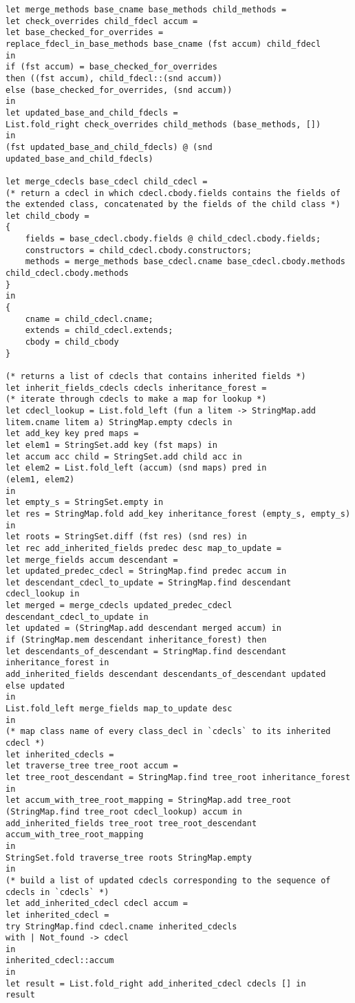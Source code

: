 \begin{verbatim}
let merge_methods base_cname base_methods child_methods =
let check_overrides child_fdecl accum = 
let base_checked_for_overrides = 
replace_fdecl_in_base_methods base_cname (fst accum) child_fdecl 
in
if (fst accum) = base_checked_for_overrides
then ((fst accum), child_fdecl::(snd accum)) 
else (base_checked_for_overrides, (snd accum))
in
let updated_base_and_child_fdecls = 
List.fold_right check_overrides child_methods (base_methods, [])
in
(fst updated_base_and_child_fdecls) @ (snd updated_base_and_child_fdecls)

let merge_cdecls base_cdecl child_cdecl = 
(* return a cdecl in which cdecl.cbody.fields contains the fields of 
the extended class, concatenated by the fields of the child class *)
let child_cbody = 
{
	fields = base_cdecl.cbody.fields @ child_cdecl.cbody.fields;
	constructors = child_cdecl.cbody.constructors;
	methods = merge_methods base_cdecl.cname base_cdecl.cbody.methods child_cdecl.cbody.methods
}
in
{
	cname = child_cdecl.cname;
	extends = child_cdecl.extends;
	cbody = child_cbody
}

(* returns a list of cdecls that contains inherited fields *)
let inherit_fields_cdecls cdecls inheritance_forest = 
(* iterate through cdecls to make a map for lookup *)
let cdecl_lookup = List.fold_left (fun a litem -> StringMap.add litem.cname litem a) StringMap.empty cdecls in
let add_key key pred maps = 
let elem1 = StringSet.add key (fst maps) in
let accum acc child = StringSet.add child acc in
let elem2 = List.fold_left (accum) (snd maps) pred in
(elem1, elem2)
in
let empty_s = StringSet.empty in
let res = StringMap.fold add_key inheritance_forest (empty_s, empty_s) in
let roots = StringSet.diff (fst res) (snd res) in
let rec add_inherited_fields predec desc map_to_update = 
let merge_fields accum descendant = 
let updated_predec_cdecl = StringMap.find predec accum in 
let descendant_cdecl_to_update = StringMap.find descendant cdecl_lookup in
let merged = merge_cdecls updated_predec_cdecl descendant_cdecl_to_update in 
let updated = (StringMap.add descendant merged accum) in 
if (StringMap.mem descendant inheritance_forest) then 
let descendants_of_descendant = StringMap.find descendant inheritance_forest in
add_inherited_fields descendant descendants_of_descendant updated
else updated
in
List.fold_left merge_fields map_to_update desc
in
(* map class name of every class_decl in `cdecls` to its inherited cdecl *)
let inherited_cdecls = 
let traverse_tree tree_root accum = 
let tree_root_descendant = StringMap.find tree_root inheritance_forest in 
let accum_with_tree_root_mapping = StringMap.add tree_root (StringMap.find tree_root cdecl_lookup) accum in
add_inherited_fields tree_root tree_root_descendant accum_with_tree_root_mapping
in
StringSet.fold traverse_tree roots StringMap.empty 
in
(* build a list of updated cdecls corresponding to the sequence of cdecls in `cdecls` *)
let add_inherited_cdecl cdecl accum = 
let inherited_cdecl = 
try StringMap.find cdecl.cname inherited_cdecls 
with | Not_found -> cdecl
in
inherited_cdecl::accum
in
let result = List.fold_right add_inherited_cdecl cdecls [] in
result


\end{verbatim}

